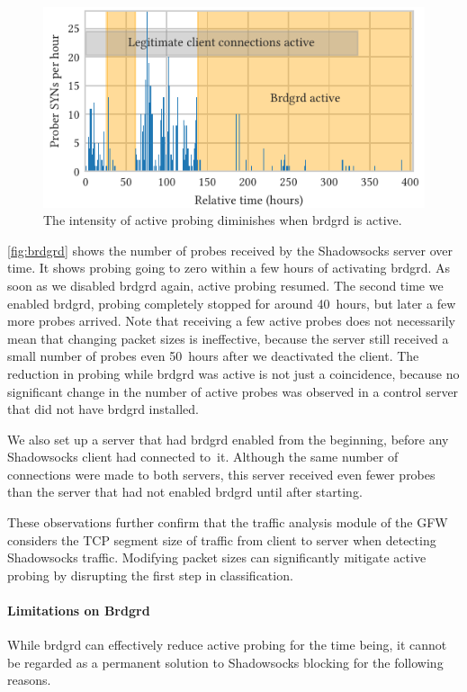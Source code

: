 \documentclass[sigconf,letterpaper]{acmart}
\begin{document}
\begin{figure}
    \includegraphics{figures/effectiveness_of_brdgrd.pdf}
\caption{
The intensity of active probing diminishes when brdgrd is active.
}
\label{fig:brdgrd}
\end{figure}

\autoref{fig:brdgrd} shows the number of probes received by the Shadowsocks server over time.
It shows probing going to zero within a few hours of activating brdgrd.
As soon as we disabled brdgrd again, active probing resumed.
The second time we enabled brdgrd,
probing completely stopped for around 40~hours, but later a few more probes arrived.
Note that receiving a few active probes does not necessarily mean that changing packet sizes is ineffective,
because the server still received a small number of probes
even 50~hours after we deactivated the client.
The reduction in probing while brdgrd was active is not just a coincidence,
because no significant change in the number of active probes was observed in a control server
that did not have brdgrd installed.

We also set up a server that had brdgrd enabled from the beginning,
before any Shadowsocks client had connected to~it.
Although the same number of connections were made to both servers,
this server received even fewer probes than the server that had not enabled brdgrd until after starting.

These observations further confirm that the traffic analysis module of the GFW considers the TCP segment size of traffic
from client to server when detecting Shadowsocks traffic.
Modifying packet sizes can significantly mitigate active probing by disrupting the first step in classification.


\paragraph{Limitations on Brdgrd}
While brdgrd can effectively reduce active probing for the time being,
it cannot be regarded as a permanent solution to Shadowsocks blocking for the following reasons.
\end{document}
